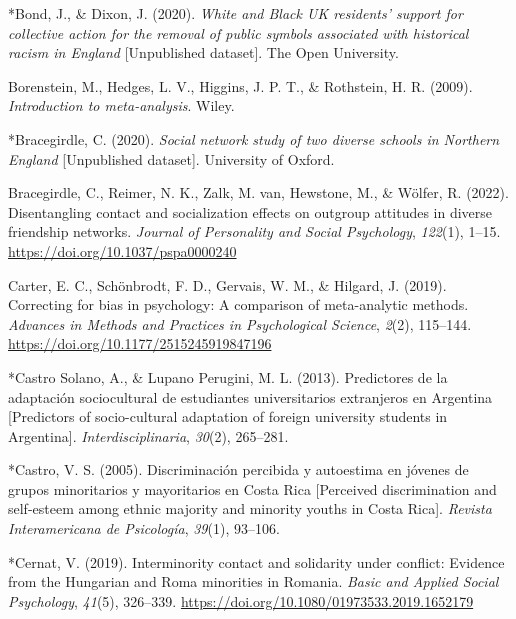 \documentclass[12pt, letterpaper]{article}
\newenvironment{CSLReferences}[2]{}{}
\begin{document}
\begin{CSLReferences}{1}{0}
\leavevmode\hypertarget{ref-2397}{}%
*Bond, J., \& Dixon, J. (2020). \emph{{White} and {Black} {UK}
residents' support for collective action for the removal of public
symbols associated with historical racism in {England}} {[}Unpublished
dataset{]}. The Open University.

\leavevmode\hypertarget{ref-borenstein_introduction_2009}{}%
Borenstein, M., Hedges, L. V., Higgins, J. P. T., \& Rothstein, H. R.
(2009). \emph{Introduction to meta-analysis}. Wiley.

\leavevmode\hypertarget{ref-2398}{}%
*Bracegirdle, C. (2020). \emph{Social network study of two diverse
schools in {Northern England}} {[}Unpublished dataset{]}. University of
Oxford.

\leavevmode\hypertarget{ref-bracegirdle_disentangling_2022}{}%
Bracegirdle, C., Reimer, N. K., Zalk, M. van, Hewstone, M., \& Wölfer,
R. (2022). Disentangling contact and socialization effects on outgroup
attitudes in diverse friendship networks. \emph{Journal of Personality
and Social Psychology}, \emph{122}(1), 1--15.
\url{https://doi.org/10.1037/pspa0000240}

\leavevmode\hypertarget{ref-carter_correcting_2019}{}%
Carter, E. C., Schönbrodt, F. D., Gervais, W. M., \& Hilgard, J. (2019).
Correcting for bias in psychology: A comparison of meta-analytic
methods. \emph{Advances in Methods and Practices in Psychological
Science}, \emph{2}(2), 115--144.
\url{https://doi.org/10.1177/2515245919847196}

\leavevmode\hypertarget{ref-1914}{}%
*Castro Solano, A., \& Lupano Perugini, M. L. (2013). Predictores de la
adaptación sociocultural de estudiantes universitarios extranjeros en
{Argentina} {[}{Predictors} of socio-cultural adaptation of foreign
university students in {Argentina}{]}. \emph{Interdisciplinaria},
\emph{30}(2), 265--281.

\leavevmode\hypertarget{ref-480}{}%
*Castro, V. S. (2005). Discriminación percibida y autoestima en jóvenes
de grupos minoritarios y mayoritarios en {Costa} {Rica} {[}{Perceived}
discrimination and self-esteem among ethnic majority and minority youths
in {Costa} {Rica}{]}. \emph{Revista Interamericana de Psicología},
\emph{39}(1), 93--106.

\leavevmode\hypertarget{ref-3205}{}%
*Cernat, V. (2019). Interminority contact and solidarity under conflict:
{Evidence} from the {Hungarian} and {Roma} minorities in {Romania}.
\emph{Basic and Applied Social Psychology}, \emph{41}(5), 326--339.
\url{https://doi.org/10.1080/01973533.2019.1652179}


\end{CSLReferences}
\end{document}
